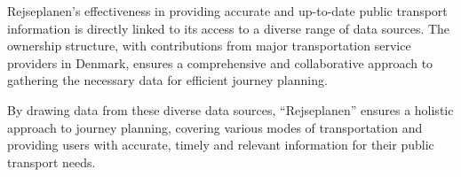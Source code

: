 Rejseplanen's effectiveness in providing accurate and up-to-date public transport information is directly linked to its
access to a diverse range of data sources.
The ownership structure, with contributions from major transportation service providers in Denmark, ensures a
comprehensive and collaborative approach to gathering the necessary data for efficient journey planning.

By drawing data from these diverse data sources, ``Rejseplanen'' ensures a holistic approach to journey planning,
covering various modes of transportation and providing users with accurate, timely and relevant information for their
public transport needs.
